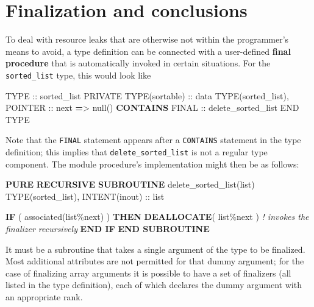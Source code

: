 \documentclass[
]{article}
\newenvironment{Shaded}{}{}
\newcommand{\CommentTok}[1]{\textcolor[rgb]{0.38,0.63,0.69}{\textit{#1}}}
\newcommand{\DataTypeTok}[1]{\textcolor[rgb]{0.56,0.13,0.00}{#1}}
\newcommand{\FunctionTok}[1]{\textcolor[rgb]{0.02,0.16,0.49}{#1}}
\newcommand{\KeywordTok}[1]{\textcolor[rgb]{0.00,0.44,0.13}{\textbf{#1}}}
\newcommand{\NormalTok}[1]{#1}
\newcommand{\OperatorTok}[1]{\textcolor[rgb]{0.40,0.40,0.40}{#1}}
\begin{document}
\section{Finalization and
conclusions}\label{finalization-and-conclusions}

To deal with resource leaks that are otherwise not within the
programmer's means to avoid, a type definition can be connected with a
user-defined \textbf{final procedure} that is automatically invoked in
certain situations. For the \texttt{sorted\_list} type, this would look
like

\begin{Shaded}
\begin{Highlighting}[]
\DataTypeTok{TYPE} \DataTypeTok{::}\NormalTok{ sorted\_list}
   \DataTypeTok{PRIVATE}
   \DataTypeTok{TYPE(sortable)} \DataTypeTok{::}\NormalTok{ data}
   \DataTypeTok{TYPE(sorted\_list)}\NormalTok{, }\DataTypeTok{POINTER} \DataTypeTok{::}\NormalTok{ next }\KeywordTok{=}\OperatorTok{\textgreater{}}\NormalTok{ null()}
\KeywordTok{CONTAINS}
   \DataTypeTok{FINAL} \DataTypeTok{::}\NormalTok{ delete\_sorted\_list}
\DataTypeTok{END TYPE}
\end{Highlighting}
\end{Shaded}

Note that the \texttt{FINAL} statement appears after a \texttt{CONTAINS}
statement in the type definition; this implies that
\texttt{delete\_sorted\_list} is not a regular type component. The
module procedure's implementation might then be as follows:

\begin{Shaded}
\begin{Highlighting}[]
\KeywordTok{PURE} \KeywordTok{RECURSIVE} \KeywordTok{SUBROUTINE}\NormalTok{ delete\_sorted\_list(list)}
   \DataTypeTok{TYPE(sorted\_list)}\NormalTok{, }\DataTypeTok{INTENT(inout)} \DataTypeTok{::}\NormalTok{ list}

   \KeywordTok{IF}\NormalTok{ ( }\FunctionTok{associated}\NormalTok{(list}\OperatorTok{\%}\NormalTok{next) ) }\KeywordTok{THEN}
      \KeywordTok{DEALLOCATE}\NormalTok{( list}\OperatorTok{\%}\NormalTok{next )  }\CommentTok{! invokes the finalizer recursively}
   \KeywordTok{END IF}
\KeywordTok{END SUBROUTINE}
\end{Highlighting}
\end{Shaded}

It must be a subroutine that takes a single argument of the type to be
finalized. Most additional attributes are not permitted for that dummy
argument; for the case of finalizing array arguments it is possible to
have a set of finalizers (all listed in the type definition), each of
which declares the dummy argument with an appropriate rank.
\end{document}
